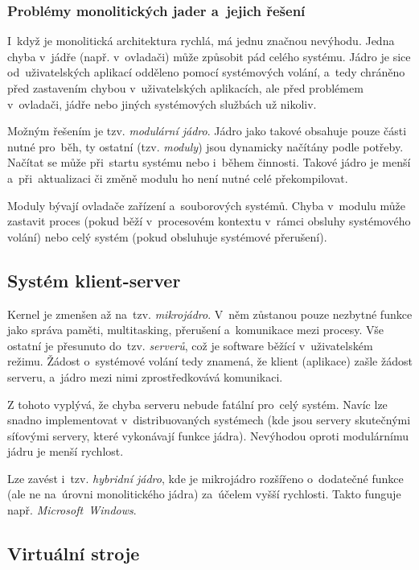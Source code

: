 \subsubsection{Problémy monolitických jader a~jejich řešení}

I~když je monolitická architektura rychlá, má jednu značnou nevýhodu. Jedna chyba v~jádře (např. v~ovladači) může způsobit pád celého systému. Jádro je sice od~uživatelských aplikací odděleno pomocí systémových volání, a~tedy chráněno před zastavením chybou v~uživatelských aplikacích, ale před problémem v~ovladači, jádře nebo jiných systémových službách už nikoliv.

Možným řešením je tzv. \emph{modulární jádro}. Jádro jako takové obsahuje pouze části nutné pro~běh, ty ostatní (tzv. \emph{moduly}) jsou dynamicky načítány podle potřeby. Načítat se může při~startu systému nebo i~během činnosti. Takové jádro je menší a~při~aktualizaci či změně modulu ho není nutné celé překompilovat.

Moduly bývají ovladače zařízení a~souborových systémů. Chyba v~modulu může zastavit proces (pokud běží v~procesovém kontextu v~rámci obsluhy systémového volání) nebo celý systém (pokud obsluhuje systémové přerušení).

\subsection{Systém klient-server}

Kernel je zmenšen až na~tzv. \emph{mikrojádro}. V~něm zůstanou pouze nezbytné funkce jako správa paměti, multitasking, přerušení a~komunikace mezi procesy. Vše ostatní je přesunuto do~tzv. \emph{serverů}, což je software běžící v~uživatelském režimu. Žádost o~systémové volání tedy znamená, že klient (aplikace) zašle žádost serveru, a~jádro mezi nimi zprostředkovává komunikaci.

Z tohoto vyplývá, že chyba serveru nebude fatální pro~celý systém. Navíc lze snadno implementovat v~distribuovaných systémech (kde jsou servery skutečnými síťovými servery, které vykonávají funkce jádra). Nevýhodou oproti modulárnímu jádru je menší rychlost.

\vspace{0,5cm}
Lze zavést i~tzv. \emph{hybridní jádro}, kde je mikrojádro rozšířeno o~dodatečné funkce (ale ne na~úrovni monolitického jádra) za~účelem vyšší rychlosti. Takto funguje např. \emph{Microsoft~Windows}.

\subsection{Virtuální stroje}

